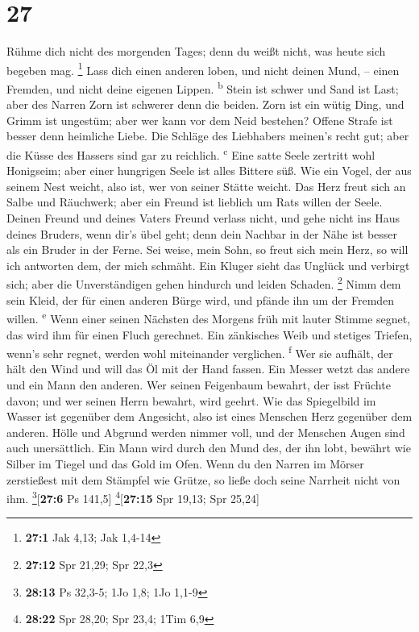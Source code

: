 \hypertarget{section-26}{%
\section{27}\label{section-26}}

 Rühme dich nicht des morgenden Tages; denn du weißt
nicht, was heute sich begeben mag. \footnote{\textbf{27:1} Jak 4,13; Jak
  1,4-14}  Lass dich einen anderen loben, und nicht deinen
Mund, -- einen Fremden, und nicht deine eigenen Lippen.
\textsuperscript{b}  Stein ist schwer und Sand ist Last;
aber des Narren Zorn ist schwerer denn die beiden.  Zorn
ist ein wütig Ding, und Grimm ist ungestüm; aber wer kann vor dem Neid
bestehen?  Offene Strafe ist besser denn heimliche Liebe.
 Die Schläge des Liebhabers meinen's recht gut; aber die
Küsse des Hassers sind gar zu reichlich. \textsuperscript{c}
 Eine satte Seele zertritt wohl Honigseim; aber einer
hungrigen Seele ist alles Bittere süß.  Wie ein Vogel, der
aus seinem Nest weicht, also ist, wer von seiner Stätte weicht.
 Das Herz freut sich an Salbe und Räuchwerk; aber ein
Freund ist lieblich um Rats willen der Seele.  Deinen
Freund und deines Vaters Freund verlass nicht, und gehe nicht ins Haus
deines Bruders, wenn dir's übel geht; denn dein Nachbar in der Nähe ist
besser als ein Bruder in der Ferne.  Sei weise, mein
Sohn, so freut sich mein Herz, so will ich antworten dem, der mich
schmäht.  Ein Kluger sieht das Unglück und verbirgt sich;
aber die Unverständigen gehen hindurch und leiden Schaden. \footnote{\textbf{27:12}
  Spr 21,29; Spr 22,3}  Nimm dem sein Kleid, der für
einen anderen Bürge wird, und pfände ihn um der Fremden willen.
\textsuperscript{e}  Wenn einer seinen Nächsten des
Morgens früh mit lauter Stimme segnet, das wird ihm für einen Fluch
gerechnet.  Ein zänkisches Weib und stetiges Triefen,
wenn's sehr regnet, werden wohl miteinander verglichen.
\textsuperscript{f}  Wer sie aufhält, der hält den Wind
und will das Öl mit der Hand fassen.  Ein Messer wetzt
das andere und ein Mann den anderen.  Wer seinen
Feigenbaum bewahrt, der isst Früchte davon; und wer seinen Herrn
bewahrt, wird geehrt.  Wie das Spiegelbild im Wasser ist
gegenüber dem Angesicht, also ist eines Menschen Herz gegenüber dem
anderen.  Hölle und Abgrund werden nimmer voll, und der
Menschen Augen sind auch unersättlich.  Ein Mann wird
durch den Mund des, der ihn lobt, bewährt wie Silber im Tiegel und das
Gold im Ofen.  Wenn du den Narren im Mörser zerstießest
mit dem Stämpfel wie Grütze, so ließe doch seine Narrheit nicht von ihm.
\footnote{\textbf{28:13} Ps 32,3-5; 1Jo 1,8; 1Jo 1,1-9}{[}\textbf{27:6}
Ps 141,5{]} \footnote{\textbf{28:22} Spr 28,20; Spr 23,4; 1Tim 6,9}{[}\textbf{27:15}
Spr 19,13; Spr 25,24{]}

